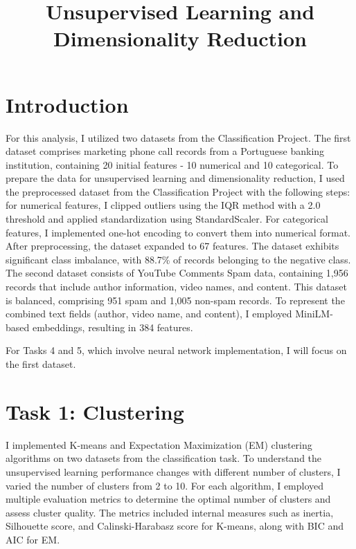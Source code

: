 \documentclass[conference]{IEEEtran}
\begin{document}
\setlength{\itemsep}{0pt} %
\setlength{\parskip}{0pt}
\title{Unsupervised Learning and Dimensionality Reduction}
\author{}
\maketitle

\section{Introduction}
For this analysis, I utilized two datasets from the Classification Project. The first dataset comprises marketing phone call records from a Portuguese banking institution, containing 20 initial features - 10 numerical and 10 categorical. To prepare the data for unsupervised learning and dimensionality reduction, I used the preprocessed dataset from the Classification Project with the following steps: for numerical features, I clipped outliers using the IQR method with a 2.0 threshold and applied standardization using StandardScaler. For categorical features, I implemented one-hot encoding to convert them into numerical format. After preprocessing, the dataset expanded to 67 features. The dataset exhibits significant class imbalance, with 88.7\% of records belonging to the negative class.
The second dataset consists of YouTube Comments Spam data, containing 1,956 records that include author information, video names, and content. This dataset is balanced, comprising 951 spam and 1,005 non-spam records. To represent the combined text fields (author, video name, and content), I employed MiniLM-based embeddings, resulting in 384 features.

For Tasks 4 and 5, which involve neural network implementation, I will focus on the first dataset. 

\section{Task 1: Clustering}
I implemented K-means and Expectation Maximization (EM) clustering algorithms on two datasets from the classification task. To understand the unsupervised learning performance changes with different number of clusters, I varied the number of clusters from 2 to 10. For each algorithm, I employed multiple evaluation metrics to determine the optimal number of clusters and assess cluster quality. The metrics included internal measures such as inertia, Silhouette score, and Calinski-Harabasz score for K-means, along with BIC and AIC for EM. 
\end{document}

